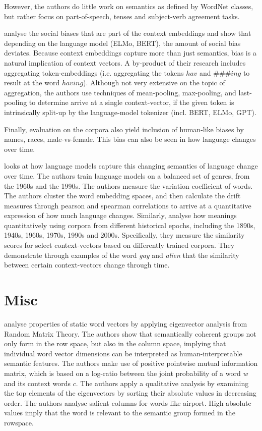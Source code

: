 \documentclass[a4paper,12pt,twoside,openright]{report}
\begin{document}
However, the authors do little work on semantics as defined by WordNet classes, but rather focus on part-of-speech, tenses and subject-verb agreement tasks.

\cite{may19} analyse the social biases that are part of the context embeddings and show that depending on the language model (ELMo, BERT), the amount of social bias deviates. 
Because context embeddings capture more than just semantics, bias is a natural implication of context vectors.
A by-product of their research includes aggregating token-embeddings (i.e. aggregating the tokens $hav$ and $\#\#\#ing$ to result at the word $having$).
Although not very extensive on the topic of aggregation, the authors  use techniques of mean-pooling, max-pooling, and last-pooling to determine arrive at a single context-vector, if the given token is intrinsically split-up by the language-model tokenizer (incl. BERT, ELMo, GPT).

Finally, evaluation on the corpora also yield inclusion of human-like biases \cite{jentzsch19} by names, races, male-vs-female.
This bias can also be seen in how language changes over time.

\cite{martinc20} looks at how language models capture this  changing semantics of language change over time.
The authors train language models on a balanced set of genres, from the 1960s and the 1990s.
The authors measure the variation coefficient of words.
The authors cluster the word embedding spaces, and then calculate the drift measures through pearson and spearman correlations to arrive at a quantitative expression of how much language changes.
Similarly, \cite{hu19} analyse how meanings quantitatively using corpora from different historical epochs, including the 1890s, 1940s, 1960s, 1970s, 1990s and 2000s. 
Specifically, they measure the similarity scores for select context-vectors based on differently trained corpora.
They demonstrate through examples of the word \textit{gay} and \textit{alien} that the similarity between certain context-vectors change through time.

\section{Misc}

\cite{shin18} analyse properties of static word vectors by applying eigenvector analysis from Random Matrix Theory.
The authors show that semantically coherent groups not only form in the row space, but also in the column space, implying that individual word vector dimensions can be interpreted as human-interpretable semantic features.
The authors make use of positive pointwise mutual information matrix, which is based on a log-ratio between the joint probability of a word $w$ and its context words $c$.
The authors apply a qualitative analysis by examining the top elements of the eigenvectors by sorting their absolute values in decreasing order.
The authors analyse salient columns for words like airport.
High absolute values imply that the word is relevant to the semantic group formed in the rowspace.
\end{document}
